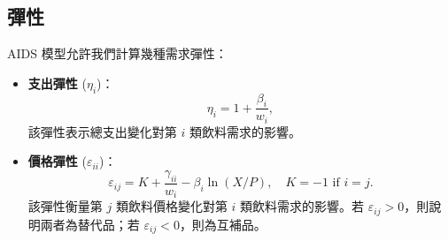 \subsection*{彈性}
AIDS 模型允許我們計算幾種需求彈性：
\begin{itemize}
    \item \textbf{支出彈性} (\(\eta_i\))：
    \begin{equation}
    \eta_i = 1 + \frac{\beta_i}{w_i},
    \end{equation}
    該彈性表示總支出變化對第 \(i\) 類飲料需求的影響。
    \item \textbf{價格彈性} (\(\varepsilon_{ii}\))：
    \begin{equation}
    \varepsilon_{ij} = K + \frac{\gamma_{ii}}{w_i} - \beta_i \ln(X / P), \quad
    K = -1 \text{ if } i=j.
    \end{equation}
    該彈性衡量第 \(j\) 類飲料價格變化對第 \(i\) 類飲料需求的影響。若 \(\varepsilon_{ij} > 0\)，則說明兩者為替代品；若 \(\varepsilon_{ij} < 0\)，則為互補品。
    
\end{itemize}

